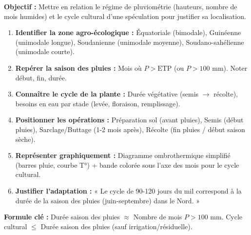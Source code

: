 \documentclass[11pt]{article}
\begin{document}
\begin{methode}
\textbf{Objectif :} Mettre en relation le régime de pluviométrie (hauteurs, nombre de mois humides) et le cycle cultural d'une spéculation pour justifier sa localisation.
\begin{enumerate}
    \item \textbf{Identifier la zone agro-écologique :} Équatoriale (bimodale), Guinéenne (unimodale longue), Soudanienne (unimodale moyenne), Soudano-sahélienne (unimodale courte).
    \item \textbf{Repérer la saison des pluies :} Mois où $P > \text{ETP}$ (ou $P > 100$ mm). Noter début, fin, durée.
    \item \textbf{Connaître le cycle de la plante :} Durée végétative (semis $\to$ récolte), besoins en eau par stade (levée, floraison, remplissage).
    \item \textbf{Positionner les opérations :} Préparation sol (avant pluies), Semis (début pluies), Sarclage/Buttage (1-2 mois après), Récolte (fin pluies / début saison sèche).
    \item \textbf{Représenter graphiquement :} Diagramme ombrothermique simplifié (barres pluie, courbe T°) + bande colorée sous l'axe des mois pour le cycle cultural.
    \item \textbf{Justifier l'adaptation :} « Le cycle de 90-120 jours du mil correspond à la durée de la saison des pluies (juin-septembre) dans le Nord. »
\end{enumerate}
\textbf{Formule clé :} Durée saison des pluies $\approx$ Nombre de mois $P > 100$ mm. Cycle cultural $\le$ Durée saison des pluies (sauf irrigation/résiduelle).
\end{methode}
\end{document}
